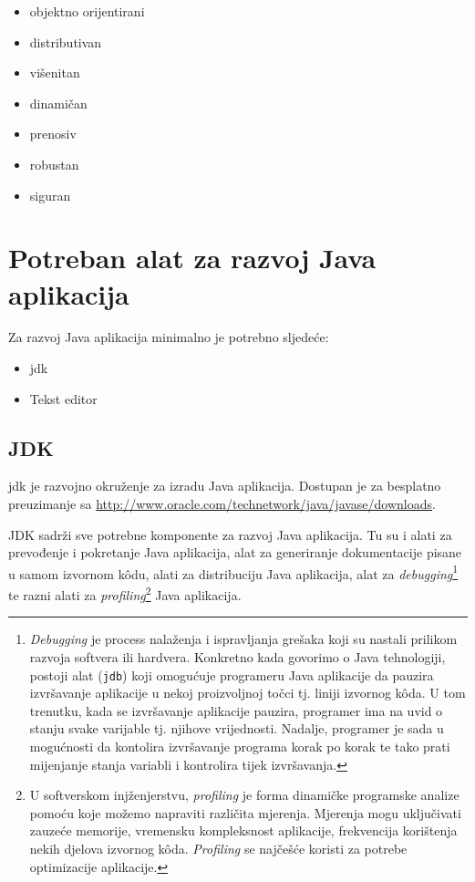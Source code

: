 \begin{itemize}
    \item objektno orijentirani
    \item distributivan
    \item višenitan
    \item dinamičan
    \item prenosiv
    \item robustan
    \item siguran
\end{itemize}

\section{Potreban alat za razvoj Java aplikacija}
Za razvoj Java aplikacija minimalno je potrebno sljedeće:

\begin{itemize}
    \item \gls{jdk}
    \item Tekst editor
\end{itemize}

\subsection{JDK}
\gls{jdk} je razvojno okruženje za izradu Java aplikacija. Dostupan je za besplatno preuzimanje sa \url{http://www.oracle.com/technetwork/java/javase/downloads}.

\begin{infobox}
    JDK sadrži sve potrebne komponente za razvoj Java aplikacija. Tu su i alati za prevođenje i pokretanje Java aplikacija, alat za generiranje dokumentacije pisane u samom izvornom kôdu, alati za distribuciju Java aplikacija, alat za \emph{debugging}\footnote{\emph{Debugging} je process nalaženja i ispravljanja grešaka koji su nastali prilikom razvoja softvera ili hardvera. Konkretno kada govorimo o Java tehnologiji, postoji alat (\texttt{jdb}) koji omogućuje programeru Java aplikacije da pauzira izvršavanje aplikacije u nekoj proizvoljnoj točci tj. liniji izvornog kôda. U tom trenutku, kada se izvršavanje aplikacije pauzira, programer ima na uvid o stanju svake varijable tj. njihove vrijednosti. Nadalje, programer je sada u mogućnosti da kontolira izvršavanje programa korak po korak te tako prati mijenjanje stanja variabli i kontrolira tijek izvršavanja.} te razni alati za \emph{profiling}\footnote{U softverskom injženjerstvu, \emph{profiling} je forma dinamičke programske analize pomoću koje možemo napraviti različita mjerenja. Mjerenja mogu uključivati zauzeće memorije, vremensku kompleksnost aplikacije, frekvencija korištenja nekih djelova izvornog kôda. \emph{Profiling} se najčešće koristi za potrebe optimizacije aplikacije.} Java aplikacija.
\end{infobox}

